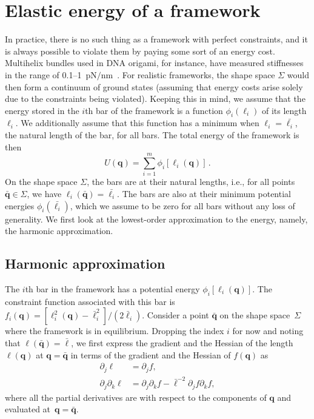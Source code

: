 \section{Elastic energy of a framework}
\label{sec:energy}

In practice, there is no such thing as a framework with perfect constraints, and it is always possible to violate them by paying some sort of an energy cost.
Multihelix bundles used in DNA origami, for instance, have measured stiffnesses in the range of 0.1--1~pN$/$nm~\cite{jung2020}.
For realistic frameworks, the shape space $\Sigma$ would then form a continuum of ground states (assuming that energy costs arise solely due to the constraints being violated).
Keeping this in mind, we assume that the energy stored in the $i$th bar of the framework is a function $\phi_i(\ell_i)$ of its length $\ell_i$.
We additionally assume that this function has a minimum when $\ell_i = \bar{\ell_i}$, the natural length of the bar, for all bars.
The total energy of the framework is then
%
\begin{equation}
  U({\bm{q}}) = \sum_{i=1}^{m} \phi_i[\ell_i({\bm{q}})]\,.
\end{equation}
%
On the shape space $\Sigma$, the bars are at their natural lengths, i.e., for all points $\bar{\bm{q}} \in \Sigma$, we have $\ell_i(\bar{\bm{q}}) = \bar{\ell_i}$.
The bars are also at their minimum potential energies $\phi_i(\bar{\ell_i})$, which we assume to be zero for all bars without any loss of generality.
We first look at the lowest-order approximation to the energy, namely, the harmonic approximation.

\subsection{Harmonic approximation}

The $i$th bar in the framework has a potential energy $\phi_i[\ell_i(\bm{q})]$.
The constraint function associated with this bar is $f_i(\bm{q}) = [\ell_i^2(\bm{q}) - \bar{\ell}_i^2]/(2\bar{\ell}_i)$.
Consider a point $\bar{\bm{q}}$ on the shape space~$\Sigma$ where the framework is in equilibrium.
Dropping the index $i$ for now and noting that $\ell(\bar{\bm{q}}) = \bar{\ell}$, we first express the gradient and the Hessian of the length $\ell(\bm{q})$ at $\bm{q} = \bar{\bm{q}}$ in terms of the gradient and the Hessian of $f(\bm{q})$ as
%
\begin{equation}
\begin{aligned}
  \partial_j \ell &= \partial_j f,\\
  \partial_j\partial_k \ell &= \partial_j\partial_k f - \bar{\ell}^{-2}\partial_j f\partial_k f,
  \label{sm:eq:lentomap}
\end{aligned}
\end{equation}
%
where all the partial derivatives are with respect to the components of $\bm{q}$ and evaluated at~$\bm{q} = \bar{\bm{q}}$.

